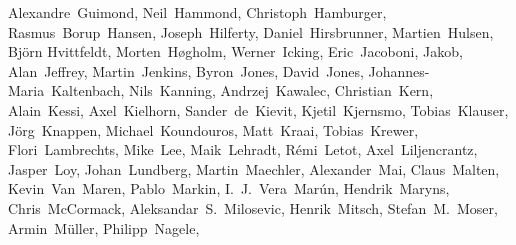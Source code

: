 \begin{flushleft}
Alexandre~Guimond,      %
Neil~Hammond,           %
Christoph~Hamburger,    %
Rasmus~Borup~Hansen,    %
Joseph~Hilferty,        %
Daniel~Hirsbrunner,     %
Martien~Hulsen,         %
Bj\"orn Hvittfeldt,     %
Morten~H\o gholm,       %
Werner~Icking,          %
Eric~Jacoboni,          %
Jakob,                  %
Alan~Jeffrey,           %
Martin~Jenkins,         %
Byron~Jones,            %
David~Jones,            %
Johannes-Maria~Kaltenbach, %
Nils~Kanning,           %
Andrzej~Kawalec,        %
Christian~Kern,         %
Alain~Kessi,            %
Axel~Kielhorn,          %
Sander~de~Kievit,       %
Kjetil~Kjernsmo,        %
Tobias~Klauser,		%
J\"org~Knappen,         %
Michael~Koundouros,     %
Matt~Kraai,             %
Tobias~Krewer,          %
Flori~Lambrechts,       %
Mike~Lee,               %
Maik~Lehradt,           %
R\'emi~Letot,           %
Axel~Liljencrantz,	%
Jasper~Loy,             %
Johan~Lundberg,         %
Martin~Maechler,        %
Alexander~Mai,          %
Claus~Malten,           %
Kevin~Van~Maren,        %
Pablo~Markin,
I.~J.~Vera~Mar\'un,     %
Hendrik~Maryns,         %
Chris~McCormack,        %
Aleksandar~S.~Milosevic, %
Henrik~Mitsch,          %
Stefan~M.~Moser,        %
Armin~M\"uller,		%
Philipp~Nagele,         %

\end{flushleft}
